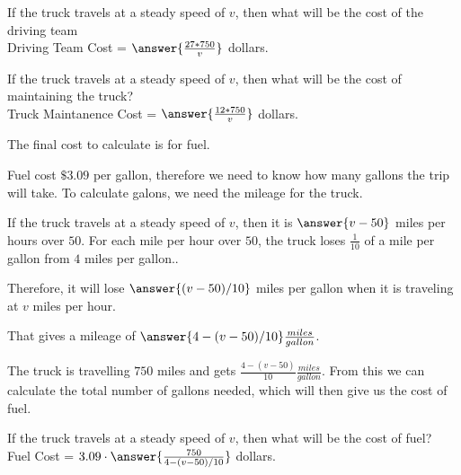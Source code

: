 \documentclass{ximera}
\begin{document}
\begin{question} \boxdot
If the truck travels at a steady speed of $v$, then what will be the cost of the driving team \\

Driving Team Cost = $\answer{\frac{27*750}{v}}$ dollars.
\end{question}




\begin{question} \boxdot
If the truck travels at a steady speed of $v$, then what will be the cost of maintaining the truck? \\

Truck Maintanence Cost = $\answer{\frac{12*750}{v}}$ dollars.
\end{question}



The final cost to calculate is for fuel.

Fuel cost $\$3.09$ per gallon, therefore we need to know how many gallons the trip will take. To calculate galons, we need the mileage for the truck.


\begin{explanation}

If the truck travels at a steady speed of $v$, then it is $\answer{v-50}$ miles per hours over $50$. For each mile per hour over $50$, the truck loses $\frac{1}{10}$ of a mile per gallon from $4$ miles per gallon..

Therefore, it will lose $\answer{(v-50)/10}$ miles per gallon when it is traveling at $v$ miles per hour.

That gives a mileage of $\answer{4-(v-50)/10} \frac{miles}{gallon}$.

\end{explanation}


The truck is travelling $750$ miles and gets $\frac{4-(v-50)}{10} \frac{miles}{gallon}$. From this we can calculate the total number of gallons needed, which will then give us the cost of fuel.






\begin{question} \boxdot
If the truck travels at a steady speed of $v$, then what will be the cost of fuel? \\

Fuel Cost = $ 3.09 \cdot \answer{\frac{750}{4-(v-50)/10}}$ dollars.
\end{question}
\end{document}

